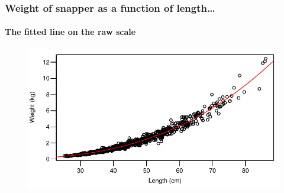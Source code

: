 \documentclass{beamer}\usepackage[]{graphicx}\usepackage[]{xcolor}
\begin{document}
\begin{frame}[fragile]
\frametitle{Weight of snapper as a function of length\ldots}
\framesubtitle{The fitted line on the raw scale}


\begin{figure}
  \centering
  \includegraphics{figure/RC-H07-016}
\end{figure}

\end{frame}
\end{document}
